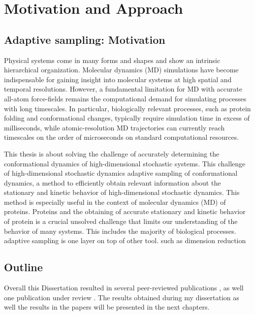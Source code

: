 \chapter{Motivation and Approach}

\section{Adaptive sampling: Motivation}
Physical systems come in many forms and shapes and show an intrinsic hierarchical organization. Molecular dynamics (MD) simulations have become indispensable for gaining
insight into molecular systems at high spatial and temporal resolutions.
However, a fundamental limitation for MD with accurate all-atom force-fields remains
the computational demand for simulating processes with long timescales. In
particular, biologically relevant processes, such as protein folding and
conformational changes, typically require simulation time in excess of
milliseconds, while atomic-resolution MD trajectories can currently reach
timescales on the order of microseconds on standard computational resources. 



This thesis is about solving the challenge of accurately determining the conformational dynamics of high-dimensional stochastic systems. This challenge of high-dimensional stochastic dynamics 
adaptive sampling of conformational dynamics, a method to efficiently obtain relevant information about the stationary and kinetic behavior of high-dimensional stochastic dynamics. This method is especially useful in the context of molecular dynamics (MD) of proteins. Proteins and the obtaining of accurate stationary and kinetic behavior of protein is a crucial unsolved challenge that limits our understanding of the behavior of many systems. This includes the majority of biological processes.
adaptive sampling is one layer on top 
of other tool. such as dimension reduction



\section{Outline}
 
Overall this Dissertation resulted in several peer-reviewed publications \cite{Adstrategies2018, Extasy2016}, as well one publication under review \cite{Extasy2019}. The results obtained during my dissertation as well the results in the papers will be presented in the next chapters.
 
